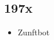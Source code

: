 \subsection*{197x}
\begin{history}


    \begin{itemize}

        \item Zunftbot\\

    \end{itemize}

\end{history}
